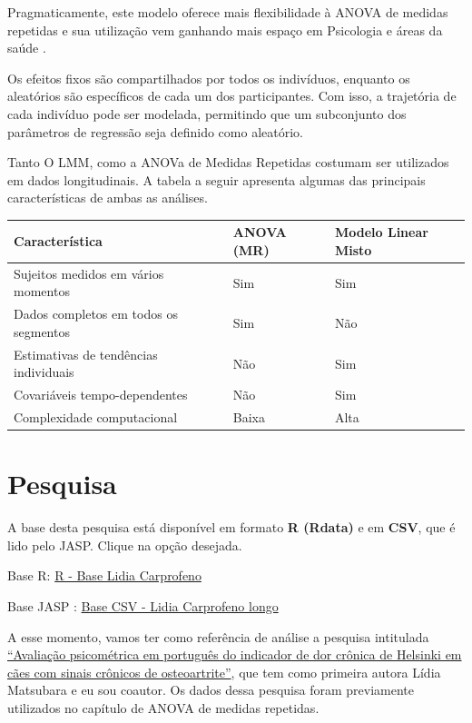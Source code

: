 \documentclass[
]{book}
\newenvironment{base}{
  \definecolor{shadecolor}{rgb}{0.972,0.972,0.972}  %
  \color{black}
  \begin{shaded}}
 {\end{shaded}}
\begin{document}
Pragmaticamente, este modelo oferece mais flexibilidade à ANOVA de medidas repetidas e sua utilização vem ganhando mais espaço em Psicologia e áreas da saúde \citep{Gueorguieva2004}.

Os efeitos fixos são compartilhados por todos os indivíduos, enquanto os aleatórios são específicos de cada um dos participantes. Com isso, a trajetória de cada indivíduo pode ser modelada, permitindo que um subconjunto dos parâmetros de regressão seja definido como aleatório.

Tanto O LMM, como a ANOVa de Medidas Repetidas costumam ser utilizados em dados longitudinais. A tabela a seguir apresenta algumas das principais características de ambas as análises.

\begin{longtable}[]{@{}lll@{}}
\toprule
Característica & ANOVA (MR) & Modelo Linear Misto \\
\midrule
\endhead
Sujeitos medidos em vários momentos & Sim & Sim \\
Dados completos em todos os segmentos & Sim & Não \\
Estimativas de tendências individuais & Não & Sim \\
Covariáveis tempo-dependentes & Não & Sim \\
Complexidade computacional & Baixa & Alta \\
\bottomrule
\end{longtable}

\hypertarget{pesquisa-7}{%
\section{Pesquisa}\label{pesquisa-7}}

\begin{base}
A base desta pesquisa está disponível em formato \textbf{R (Rdata)} e em \textbf{CSV}, que é lido pelo JASP. Clique na opção desejada.

Base R: \href{https://github.com/anovabr/mqt/raw/master/bases/R\%20-\%20Base\%20Lidia\%20Carprofeno.RData}{R - Base Lidia Carprofeno}

Base JASP : \href{https://github.com/anovabr/mqt/raw/master/bases/bases_csv_jasp.zip}{Base CSV - Lidia Carprofeno longo}

\end{base}

A esse momento, vamos ter como referência de análise a pesquisa intitulada \href{https://www.scielo.br/scielo.php?script=sci_arttext\&pid=S0102-09352019000100109}{``Avaliação psicométrica em português do indicador de dor crônica de Helsinki em cães com sinais crônicos de osteoartrite''}, que tem como primeira autora Lídia Matsubara e eu sou coautor. Os dados dessa pesquisa foram previamente utilizados no capítulo de ANOVA de medidas repetidas.
\end{document}
